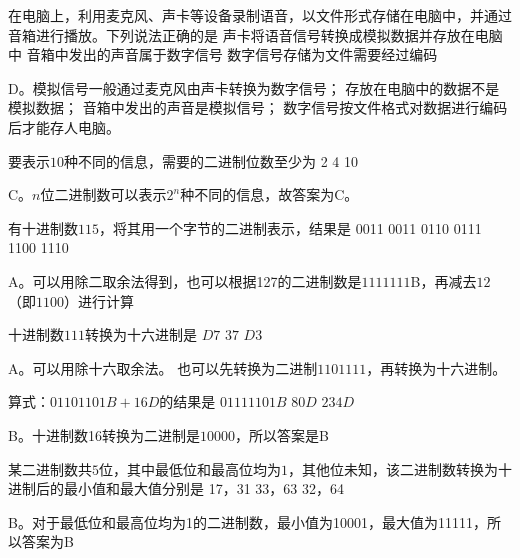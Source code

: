 \begin{groups}
\begin{questions}[rp]
\question
{}在电脑上，利用麦克风、声卡等设备录制语音，以文件形式存储在电脑中，并通过音箱进行播放。下列说法正确的是
{声卡将语音信号转换成模拟数据并存放在电脑中}
{音箱中发出的声音属于数字信号}
{数字信号存储为文件需要经过编码}
\begin{solution}
D。模拟信号一般通过麦克风由声卡转换为数字信号；
存放在电脑中的数据不是模拟数据；
音箱中发出的声音是模拟信号；
数字信号按文件格式对数据进行编码后才能存人电脑。
\end{solution}

\question
{}要表示$10$种不同的信息，需要的二进制位数至少为
{2}
{4}
{10}
\begin{solution}
C。$n$位二进制数可以表示$2^n$种不同的信息，故答案为C。
\end{solution}

\question
{}有十进制数$115$，将其用一个字节的二进制表示，结果是
{0011 0011}
{0110 0111}
{1100 1110}
\begin{solution}
A。可以用除二取余法得到，也可以根据127的二进制数是$1111111$B，再减去$12$（即$1100$）进行计算
\end{solution}

\question
{}十进制数$111$转换为十六进制是
{$D7$}
{$37$}
{$D3$}
\begin{solution}
A。可以用除十六取余法。
也可以先转换为二进制$1101111$，再转换为十六进制。
\end{solution}

\question
{}算式：$0110 1101B + 16D$的结果是
{$0111 1101B$}
{$80D$}
{$234D$}
\begin{solution}
B。十进制数16转换为二进制是$10000$，所以答案是B
\end{solution}

\question
{}某二进制数共$5$位，其中最低位和最高位均为$1$，其他位未知，该二进制数转换为十进制后的最小值和最大值分别是
{17，31}
{33，63}
{32，64}
\begin{solution}
B。对于最低位和最高位均为1的二进制数，最小值为10001，最大值为11111，所以答案为B
\end{solution}


\end{questions}
\end{groups}
